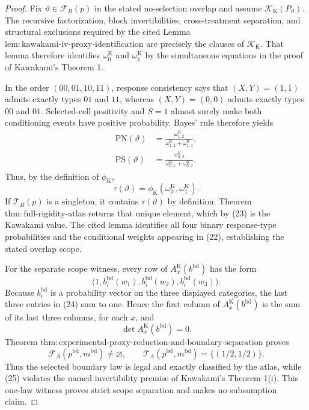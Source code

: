 \documentclass{article}
\begin{document}
\begin{proof}
Fix \(\vartheta\in\mathcal F_B(p)\) in the stated no-selection overlap and assume \(\mathcal K_{\mathrm K}(P_{\vartheta})\).  The recursive factorization, block invertibilities, cross-treatment separation, and structural exclusions required by the cited Lemma \(\mathrm{lem{:}kawakami\text{-}iv\text{-}proxy\text{-}identification}\) are precisely the clauses of \(\mathcal K_{\mathrm K}\).  That lemma therefore identifies \(\omega_0^{\mathrm K}\) and \(\omega_1^{\mathrm K}\) by the simultaneous equations in the proof of Kawakami's Theorem 1.

In the order \((00,01,10,11)\), response consistency says that \((X,Y)=(1,1)\) admits exactly types \(01\) and \(11\), whereas \((X,Y)=(0,0)\) admits exactly types \(00\) and \(01\).  Selected-cell positivity and \(S=1\) almost surely make both conditioning events have positive probability.  Bayes' rule therefore yields
\[
 \begin{aligned}
 \mathrm{PN}(\vartheta)
 &=\frac{\omega^{\mathrm K}_{1,2}}
         {\omega^{\mathrm K}_{1,2}+\omega^{\mathrm K}_{1,4}},\\
 \mathrm{PS}(\vartheta)
 &=\frac{\omega^{\mathrm K}_{0,2}}
         {\omega^{\mathrm K}_{0,1}+\omega^{\mathrm K}_{0,2}}.
 \end{aligned}                                             \tag{22}
\]
Thus, by the definition of \(\phi_{\mathrm K}\),
\[
 \tau(\vartheta)
 =\phi_{\mathrm K}(\omega_0^{\mathrm K},\omega_1^{\mathrm K}). \tag{23}
\]
If \(\mathcal T_B(p)\) is a singleton, it contains \(\tau(\vartheta)\) by definition.  Theorem \(\mathrm{thm{:}full\text{-}rigidity\text{-}atlas}\) returns that unique element, which by (23) is the Kawakami value.  The cited lemma identifies all four binary response-type probabilities and the conditional weights appearing in (22), establishing the stated overlap scope.

For the separate scope witness, every row of \(A_x^{\mathrm K}(b^{\mathrm{bd}})\) has the form
\[
 \bigl(1,b_i^{\mathrm{bd}}(w_1),
          b_i^{\mathrm{bd}}(w_2),b_i^{\mathrm{bd}}(w_3)\bigr). \tag{24}
\]
Because \(b_i^{\mathrm{bd}}\) is a probability vector on the three displayed categories, the last three entries in (24) sum to one.  Hence the first column of \(A_x^{\mathrm K}(b^{\mathrm{bd}})\) is the sum of its last three columns, for each \(x\), and
\[
 \det A_x^{\mathrm K}(b^{\mathrm{bd}})=0.                  \tag{25}
\]
Theorem \(\mathrm{thm{:}experimental\text{-}proxy\text{-}reduction\text{-}and\text{-}boundary\text{-}separation}\) proves
\[
 \mathcal F_A(p^{\mathrm{bd}},m^{\mathrm{bd}})\ne\varnothing,
 \qquad
 \mathcal T_A(p^{\mathrm{bd}},m^{\mathrm{bd}})
 =\{(1/2,1/2)\}.                                          \tag{26}
\]
Thus the selected boundary law is legal and exactly classified by the atlas, while (25) violates the named invertibility premise of Kawakami's Theorem 1(i).  This one-law witness proves strict scope separation and makes no subsumption claim.
\end{proof}
\end{document}
